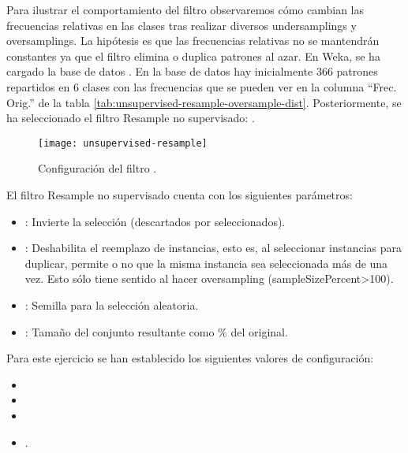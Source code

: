 Para ilustrar el comportamiento del filtro observaremos cómo cambian las frecuencias relativas en las clases tras realizar diversos undersamplings y oversamplings. La hipótesis es que las frecuencias relativas no se mantendrán constantes ya que el filtro elimina o duplica patrones al azar. En Weka, se ha cargado la base de datos . En la base de datos hay inicialmente 366 patrones repartidos en 6 clases con las frecuencias que se pueden ver en la columna ``Frec. Orig.'' de la tabla \ref{tab:unsupervised-resample-oversample-dist}. Posteriormente, se ha seleccionado el filtro Resample no supervisado: .

\begin{figure}[ht]
    \centering
    \texttt{[image: unsupervised-resample]}
    \caption{Configuración del filtro .}
    \label{fig:unsupervised-resample}
\end{figure}

El filtro Resample no supervisado cuenta con los siguientes parámetros:

\begin{itemize}
    \item {}: Invierte la selección (descartados por seleccionados).
    \item {}: Deshabilita el reemplazo de instancias, esto es, al seleccionar instancias para duplicar, permite o no que la misma instancia sea seleccionada más de una vez. Esto sólo tiene sentido al hacer oversampling (sampleSizePercent>100).
    \item {}: Semilla para la selección aleatoria.
    \item {}: Tamaño del conjunto resultante como \% del original.
\end{itemize}

Para este ejercicio se han establecido los siguientes valores de configuración:
\begin {itemize}
    \item {}
    \item {}
    \item {}
    \item {}.
\end{itemize}

